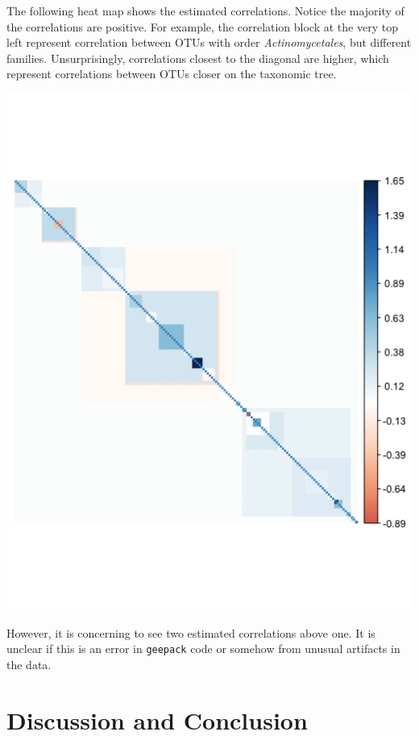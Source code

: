 \documentclass[12pt]{article}
\begin{document}
\hspace*{-\parindent}%
\begin{minipage}{.6\textwidth}
  The following heat map shows the estimated correlations. Notice the majority of the correlations are positive. For example, the correlation block at the very top left represent correlation between OTUs with order \textit{Actinomycetales}, but different families.  Unsurprisingly, correlations closest to the diagonal are higher, which represent correlations between OTUs closer on the taxonomic tree.
\end{minipage}%
\begin{minipage}{0.4\textwidth}
    \centering
    \includegraphics[width = .8\textwidth]{normal_corr.png}
\end{minipage}

However, it is concerning to see two estimated correlations above one. It is unclear if this is an error in \texttt{geepack} code or somehow from unusual artifacts in the data. 



\section{Discussion and Conclusion}
\end{document}
